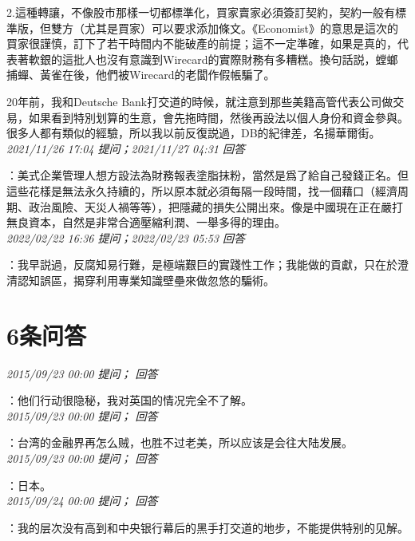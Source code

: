 \documentclass[twocolumn]{ctexart}
\begin{document}
2.這種轉讓，不像股市那樣一切都標準化，買家賣家必須簽訂契約，契約一般有標準版，但雙方（尤其是買家）可以要求添加條文。《Economist》的意思是這次的買家很謹慎，訂下了若干時間内不能破產的前提；這不一定準確，如果是真的，代表著軟銀的這批人也沒有意識到Wirecard的實際財務有多糟糕。換句話説，螳螂捕蟬、黃雀在後，他們被Wirecard的老闆作假帳騙了。

20年前，我和Deutsche Bank打交道的時候，就注意到那些美籍高管代表公司做交易，如果看到特別划算的生意，會先拖時間，然後再設法以個人身份和資金參與。很多人都有類似的經驗，所以我以前反復説過，DB的紀律差，名揚華爾街。
\\

\textit{\hfill\noindent\small 2021/11/26 17:04 提问；2021/11/27 04:31 回答}

：美式企業管理人想方設法為財務報表塗脂抹粉，當然是爲了給自己發錢正名。但這些花樣是無法永久持續的，所以原本就必須每隔一段時間，找一個藉口（經濟周期、政治風險、天災人禍等等），把隱藏的損失公開出來。像是中國現在正在嚴打無良資本，自然是非常合適壓縮利潤、一舉多得的理由。
\\

\textit{\hfill\noindent\small 2022/02/22 16:36 提问；2022/02/23 05:53 回答}

：我早説過，反腐知易行難，是極端艱巨的實踐性工作；我能做的貢獻，只在於澄清認知誤區，揭穿利用專業知識壁壘來做忽悠的騙術。
\\

\section{6条问答}

\textit{\hfill\noindent\small 2015/09/23 00:00 提问； 回答}

：他们行动很隐秘，我对英国的情况完全不了解。\\

\textit{\hfill\noindent\small 2015/09/23 00:00 提问； 回答}

：台湾的金融界再怎么贼，也胜不过老美，所以应该是会往大陆发展。\\

\textit{\hfill\noindent\small 2015/09/23 00:00 提问； 回答}

：日本。\\

\textit{\hfill\noindent\small 2015/09/24 00:00 提问； 回答}

：我的层次没有高到和中央银行幕后的黑手打交道的地步，不能提供特别的见解。
\end{document}
